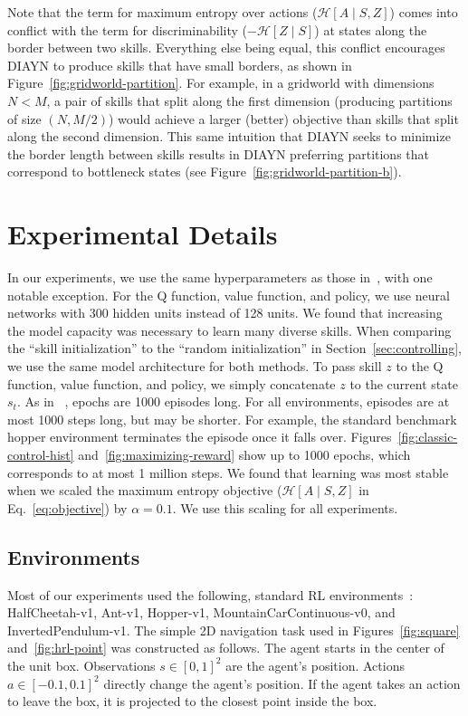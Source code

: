 \documentclass{article} %
\newcommand{\h}{\mathcal{H}}
\theoremstyle{questionstyle}\newtheorem{question}{Question}
\begin{document}
Note that the term for maximum entropy over actions ($\h[A \mid S, Z]$) comes into conflict with the term for discriminability ($-\h[Z \mid S]$) at states along the border between two skills. Everything else being equal, this conflict encourages DIAYN to produce skills that have small borders, as shown in Figure~\ref{fig:gridworld-partition}. For example, in a gridworld with dimensions $N < M$, a pair of skills that split along the first dimension (producing partitions of size $(N, M/2)$) would achieve a larger (better) objective than skills that split along the second dimension. This same intuition that DIAYN seeks to minimize the border length between skills results in DIAYN preferring partitions that correspond to bottleneck states (see Figure~\ref{fig:gridworld-partition-b}).




\section{Experimental Details}
In our experiments, we use the same hyperparameters as those in~\citet{haarnoja2018soft}, with one notable exception. For the Q function, value function, and policy, we use neural networks with 300 hidden units instead of 128 units. We found that increasing the model capacity was necessary to learn many diverse skills. When comparing the ``skill initialization'' to the ``random initialization'' in Section~\ref{sec:controlling}, we use the same model architecture for both methods.
To pass skill $z$ to the Q function, value function, and policy, we simply concatenate $z$ to the current state $s_t$.
As in ~\citet{haarnoja2018soft}, epochs are 1000 episodes long. For all environments, episodes are at most 1000 steps long, but may be shorter. For example, the standard benchmark hopper environment terminates the episode once it falls over. Figures~\ref{fig:classic-control-hist} and~\ref{fig:maximizing-reward} show up to 1000 epochs, which corresponds to at most 1 million steps.
We found that learning was most stable when we scaled the maximum entropy objective ($\h[A \mid S, Z]$ in Eq.~\ref{eq:objective}) by $\alpha = 0.1$. We use this scaling for all experiments.

\subsection{Environments}
Most of our experiments used the following, standard RL environments~\citep{brockman2016openai}: HalfCheetah-v1, Ant-v1, Hopper-v1, MountainCarContinuous-v0, and InvertedPendulum-v1. The simple 2D navigation task used in Figures~\ref{fig:square} and~\ref{fig:hrl-point} was constructed as follows. The agent starts in the center of the unit box. Observations $s \in [0, 1]^2$ are the agent's position. Actions $a \in [-0.1, 0.1]^2$ directly change the agent's position. If the agent takes an action to leave the box, it is projected to the closest point inside the box.
\end{document}
